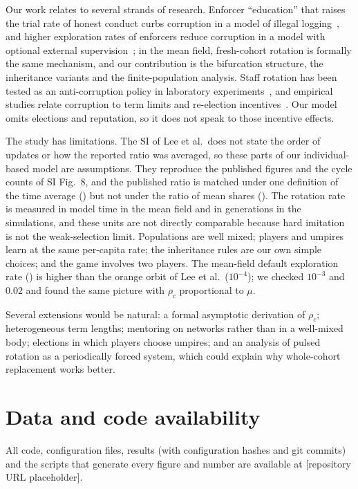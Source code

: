 \documentclass[11pt]{article}
\newcommand{\rhoc}{\rho_c}
\begin{document}
Our work relates to several strands of research. Enforcer ``education'' that raises the trial
rate of honest conduct curbs corruption in a model of illegal logging~\cite{lee2015logging}, and
higher exploration rates of enforcers reduce corruption in a model with optional external
supervision~\cite{zhou2023supervision}; in the mean field, fresh-cohort rotation is formally the
same mechanism, and our contribution is the bifurcation structure, the inheritance variants and the
finite-population analysis. Staff rotation has been tested as an anti-corruption policy in
laboratory experiments~\cite{abbink2004rotation,buhren2020rotation}, and empirical studies relate
corruption to term limits and re-election
incentives~\cite{ferraz2011electoral,laurent2021horizon}. Our model omits elections and
reputation, so it does not speak to those incentive effects.

The study has limitations. The SI of Lee et al.\ does not state the order of updates or how the reported
ratio was averaged, so these parts of our individual-based model are assumptions. They reproduce
the published figures and the cycle counts of SI Fig.~8, and the published ratio
\PaperRatio{} is matched under one definition of the time average (\BthreePure) but not under
the ratio of mean shares (\BthreeRatio). The rotation rate
is measured in model time in the mean field and in generations in the simulations, and these
units are not directly comparable because hard imitation is not the weak-selection limit.
Populations are well mixed; players and umpires learn at the same per-capita rate; the
inheritance rules are our own simple choices; and the game involves two players. The mean-field
default exploration rate (\MuMF) is higher than the orange orbit of Lee et al.\ ($10^{-4}$); we
checked $10^{-3}$ and $0.02$ and found the same picture with $\rhoc$ proportional to $\mu$.

Several extensions would be natural: a formal asymptotic derivation of $\rhoc$; heterogeneous
term lengths; mentoring on networks rather than in a well-mixed body; elections in which players
choose umpires; and an analysis of pulsed rotation as a periodically forced system, which could
explain why whole-cohort replacement works better.

\section*{Data and code availability}
All code, configuration files, results (with configuration hashes and git commits) and the
scripts that generate every figure and number are available at [repository URL placeholder].
\end{document}
